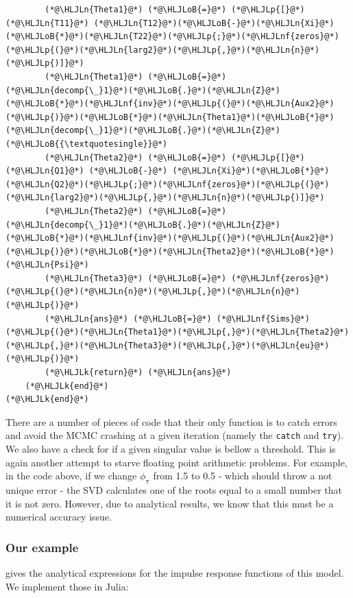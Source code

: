 \documentclass[12pt,a4paper]{article}
\newcommand{\HLJLk}[1]{\textcolor[RGB]{148,91,176}{\textbf{#1}}}
\newcommand{\HLJLn}[1]{#1}
\newcommand{\HLJLnf}[1]{\textcolor[RGB]{66,102,213}{#1}}
\newcommand{\HLJLoB}[1]{\textcolor[RGB]{102,102,102}{\textbf{#1}}}
\newcommand{\HLJLp}[1]{#1}
\begin{document}
\begin{lstlisting}
        (*@\HLJLn{Theta1}@*) (*@\HLJLoB{=}@*) (*@\HLJLp{[}@*)(*@\HLJLn{T11}@*) (*@\HLJLn{T12}@*)(*@\HLJLoB{-}@*)(*@\HLJLn{Xi}@*)(*@\HLJLoB{*}@*)(*@\HLJLn{T22}@*)(*@\HLJLp{;}@*)(*@\HLJLnf{zeros}@*)(*@\HLJLp{(}@*)(*@\HLJLn{larg2}@*)(*@\HLJLp{,}@*)(*@\HLJLn{n}@*)(*@\HLJLp{)]}@*)
        (*@\HLJLn{Theta1}@*) (*@\HLJLoB{=}@*) (*@\HLJLn{decomp{\_}1}@*)(*@\HLJLoB{.}@*)(*@\HLJLn{Z}@*)(*@\HLJLoB{*}@*)(*@\HLJLnf{inv}@*)(*@\HLJLp{(}@*)(*@\HLJLn{Aux2}@*)(*@\HLJLp{)}@*)(*@\HLJLoB{*}@*)(*@\HLJLn{Theta1}@*)(*@\HLJLoB{*}@*)(*@\HLJLn{decomp{\_}1}@*)(*@\HLJLoB{.}@*)(*@\HLJLn{Z}@*)(*@\HLJLoB{{\textquotesingle}}@*)
        (*@\HLJLn{Theta2}@*) (*@\HLJLoB{=}@*) (*@\HLJLp{[}@*)(*@\HLJLn{Q1}@*) (*@\HLJLoB{-}@*) (*@\HLJLn{Xi}@*)(*@\HLJLoB{*}@*)(*@\HLJLn{Q2}@*)(*@\HLJLp{;}@*)(*@\HLJLnf{zeros}@*)(*@\HLJLp{(}@*)(*@\HLJLn{larg2}@*)(*@\HLJLp{,}@*)(*@\HLJLn{n}@*)(*@\HLJLp{)]}@*)
        (*@\HLJLn{Theta2}@*) (*@\HLJLoB{=}@*) (*@\HLJLn{decomp{\_}1}@*)(*@\HLJLoB{.}@*)(*@\HLJLn{Z}@*)(*@\HLJLoB{*}@*)(*@\HLJLnf{inv}@*)(*@\HLJLp{(}@*)(*@\HLJLn{Aux2}@*)(*@\HLJLp{)}@*)(*@\HLJLoB{*}@*)(*@\HLJLn{Theta2}@*)(*@\HLJLoB{*}@*)(*@\HLJLn{Psi}@*)
        (*@\HLJLn{Theta3}@*) (*@\HLJLoB{=}@*) (*@\HLJLnf{zeros}@*)(*@\HLJLp{(}@*)(*@\HLJLn{n}@*)(*@\HLJLp{,}@*)(*@\HLJLn{n}@*)(*@\HLJLp{)}@*)
        (*@\HLJLn{ans}@*) (*@\HLJLoB{=}@*) (*@\HLJLnf{Sims}@*)(*@\HLJLp{(}@*)(*@\HLJLn{Theta1}@*)(*@\HLJLp{,}@*)(*@\HLJLn{Theta2}@*)(*@\HLJLp{,}@*)(*@\HLJLn{Theta3}@*)(*@\HLJLp{,}@*)(*@\HLJLn{eu}@*)(*@\HLJLp{)}@*)
        (*@\HLJLk{return}@*) (*@\HLJLn{ans}@*)
    (*@\HLJLk{end}@*)
(*@\HLJLk{end}@*)
\end{lstlisting}


There are a number of pieces of code that their only function is to catch errors and avoid the MCMC crashing at a given iteration (namely the \texttt{catch} and \texttt{try}). We also have a check for if a given singular value is bellow a threshold. This is again another attempt to starve floating point arithmetic problems. For example, in the code above, if we change $\phi_{\pi}$ from 1.5 to 0.5 - which should throw a not unique error - the SVD calculates one of the roots equal to a small number that it is not zero. However, due to analytical results, we know that this must be a numerical accuracy issue.

\subsubsection{Our example}
\cite{Gali2009} gives the analytical expressions for the impulse response functions of this model. We implement those in Julia:
\end{document}
